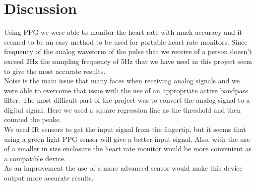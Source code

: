 \documentclass[12pt]{article}
\begin{document}
{\section{Discussion}
Using PPG we were able to monitor the heart rate with much accuracy and it seemed to be an easy method to be used for portable heart rate monitors. Since frequency of the analog waveform of the pulse that we receive of a person doesn’t exceed 2Hz the sampling frequency of 5Hz that we have used in this project seem to give the most accurate results. 
\\
Noise is the main issue that many faces when receiving analog signals and we were able to overcome that issue with the use of an appropriate active bandpass filter. The most difficult part of the project was to convert the analog signal to a digital signal. Here we used a square regression line as the threshold and then counted the peaks.
\\
We used IR sensors to get the input signal from the fingertip, but it seems that using a green light PPG sensor will give a better input signal. Also, with the use of a smaller in size enclosure the heart rate monitor would be more convenient as a compatible device.
\\
As an improvement the use of a more advanced sensor would make this device output more accurate results.


\newpage
}
\end{document}

